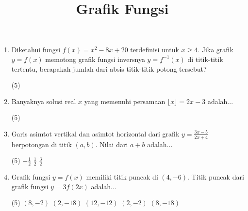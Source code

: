 \documentclass[12pt]{scrartcl}
\begin{document}
\renewcommand*\contentsname{Daftar Isi}
\tableofcontents

\newpage


\title{Grafik Fungsi}
\begin{enumerate}



\item Diketahui fungsi $f(x) = x^2 - 8x + 20$ terdefinisi untuk $x \ge 4$. Jika grafik $y=f(x)$ memotong grafik fungsi inversnya $y=f^{-1}(x)$ di titik-titik tertentu, berapakah jumlah dari absis titik-titik potong tersebut?

\begin{tasks}[label=\Alph*](5)     
\end{tasks}

\item Banyaknya solusi real $x$ yang memenuhi persamaan $\lfloor x \rfloor = 2x - 3$ adalah...

\begin{tasks}[label=\Alph*](5)     
\end{tasks}

\item Garis asimtot vertikal dan asimtot horizontal dari grafik $y = \frac{3x - 5}{2x + 4}$ berpotongan di titik $(a, b)$. Nilai dari $a+b$ adalah...

\begin{tasks}[label=\Alph*](5)   \task $-\frac{1}{2}$ \task $\frac{1}{2}$ \task $\frac{3}{2}$
\end{tasks}

\item Grafik fungsi $y = f(x)$ memiliki titik puncak di $(4, -6)$. Titik puncak dari grafik fungsi $y = 3f(2x)$ adalah...

\begin{tasks}[label=\Alph*](5) \task $(8, -2)$ \task $(2, -18)$ \task $(12, -12)$ \task $(2, -2)$ \task $(8, -18)$
\end{tasks}


\end{enumerate}
\end{document}
